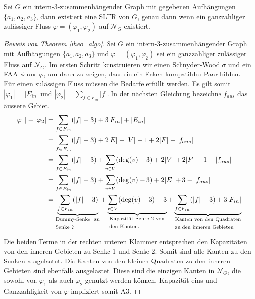\begin{theorem}\label{theo_algo}
Sei $G$ ein intern-3-zusammenhängender Graph mit gegebenen Aufhängungen $\{a_1,a_2,a_3\}$, dann existiert eine SLTR von $G$, genau dann wenn ein ganzzahliger zulässiger Fluss $\varphi=(\varphi_1,\varphi_2)$ auf $\mathcal{N}_G$ existiert.
\end{theorem}

\begin{proof}[Beweis von Theorem \ref{theo_algo}]
Sei $G$ ein intern-3-zusammenhängender Graph mit Aufhängungen $\{a_1,a_2,a_3\}$ und $\varphi=(\varphi_1,\varphi_2)$ sei ein ganzzahliger zulässiger Fluss auf $\mathcal{N}_G$. Im ersten Schritt konstruieren wir einen Schnyder-Wood $\sigma$ und ein FAA $\phi$ aus $\varphi$, um dann zu zeigen, dass sie ein Ecken kompatibles Paar bilden. Für einen zulässigen Fluss müssen die Bedarfe erfüllt werden. Es gilt somit $|\varphi_1| =  |E_{in}|$ und $|\varphi_2| = \sum_{f \in F_{in}} |f|$. In der nächsten Gleichung bezeichne $f_{aus}$ das äussere Gebiet.
\begin{equation}\label{eq_sat}
\begin{split}
|\varphi_1| + |\varphi_2| & = \sum_{f \in F_{in}} (|f|-3) + 3|F_{in}| + |E_{in}|\\
		& = \sum_{f \in F_{in}} (|f|-3) + 2|E| -|V| - 1 + 2|F| - |f_{aus}|\\
		& = \sum_{f \in F_{in}} (|f|-3) + \sum_{v \in V} (\text{deg}(v)-3) + 2|V| + 2|F| - 1 - |f_{aus}|\\
		& = \sum_{f \in F_{in}} (|f|-3) + \sum_{v \in V} (\text{deg}(v)-3) + 2|E| + 3 - |f_{aus}|\\
		& = \underbrace{\sum_{f \in F_{in}}(|f|-3)  }_{\text{\parbox{8em}{Dummy-Senke zu Senke 2}}} + \underbrace{\sum_{v \in V} (\text{deg}(v)-3) +3 }_{\text{\parbox{10em}{Kapazität Senke 2 von den Knoten.}}} +\underbrace{\sum_{f \in F_{in}}(|f|-3) + 3|F_{in}|}_{\text{\parbox{12em}{Kanten von den Quadraten zu den inneren Gebieten}}}
\end{split}
\end{equation}

Die beiden Terme in der rechten unteren Klammer entsprechen den Kapazitäten von den inneren Gebieten zu Senke 1 und Senke 2. Somit sind alle Kanten zu den Senken ausgelastet. Die Kanten von den kleinen Quadraten zu den inneren Gebieten sind ebenfalls ausgelastet. Diese sind die einzigen Kanten in $\mathcal{N}_G$, die sowohl von $\varphi_1$ als auch $\varphi_2$ genutzt werden können. Kapazität eins und Ganzzahligkeit von $\varphi$ impliziert somit A3.


\end{proof}

